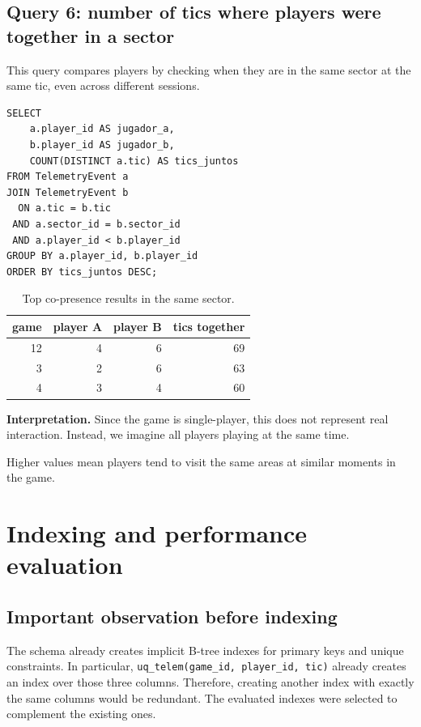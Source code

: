 \documentclass[11pt]{article}
\begin{document}
\clearpage
\subsection{Query 6: number of tics where players were together in a sector}
This query compares players by checking when they are in the same sector at the same tic, even across different sessions.

\begin{lstlisting}[style=sqlstyle]
SELECT
    a.player_id AS jugador_a,
    b.player_id AS jugador_b,
    COUNT(DISTINCT a.tic) AS tics_juntos
FROM TelemetryEvent a
JOIN TelemetryEvent b
  ON a.tic = b.tic
 AND a.sector_id = b.sector_id
 AND a.player_id < b.player_id
GROUP BY a.player_id, b.player_id
ORDER BY tics_juntos DESC;
\end{lstlisting}

\begin{table}[H]
\centering
\begin{tabular}{rrrr}
\toprule
\textbf{game} & \textbf{player A} & \textbf{player B} & \textbf{tics together} \\
\midrule
12 & 4 & 6 & 69 \\
3 & 2 & 6 & 63 \\
4 & 3 & 4 & 60 \\
\bottomrule
\end{tabular}
\caption{Top co-presence results in the same sector.}
\end{table}

\textbf{Interpretation.} Since the game is single-player, this does not represent real interaction. Instead, we imagine all players playing at the same time.

Higher values mean players tend to visit the same areas at similar moments in the game.

\section{Indexing and performance evaluation}
\subsection{Important observation before indexing}
The schema already creates implicit B-tree indexes for primary keys and unique constraints. In particular, \texttt{uq\_telem(game\_id, player\_id, tic)} already creates an index over those three columns. Therefore, creating another index with exactly the same columns would be redundant. The evaluated indexes were selected to complement the existing ones.
\end{document}
